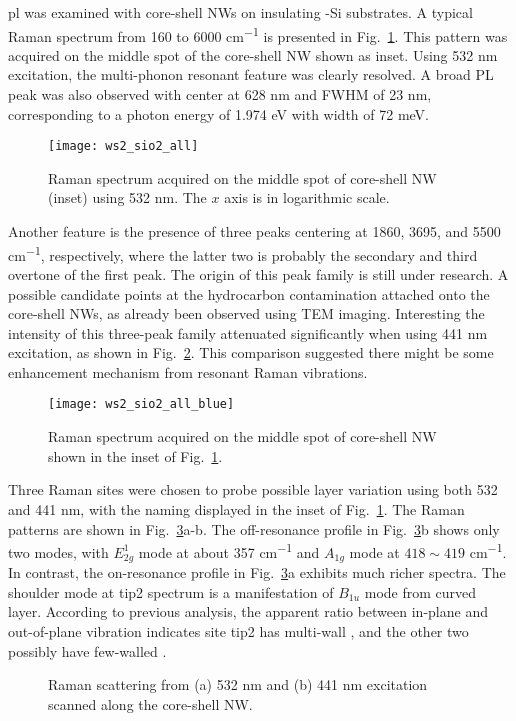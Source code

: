 \Gls{pl} was examined with core-shell NWs on insulating -Si substrates. A typical Raman spectrum from 160 to 6000 \si{cm^{-1}} is presented in Fig.~\ref{fig:ws2ramall}. This pattern was acquired on the middle spot of the core-shell NW shown as inset. Using 532 nm excitation, the multi-phonon resonant feature was clearly resolved. A broad PL peak was also observed with center at 628 nm and FWHM of 23 nm, corresponding to a photon energy of 1.974 eV with width of 72 meV.  
\begin{figure}[htb]
\centering
\texttt{[image: ws2\_sio2\_all]}
\caption{Raman spectrum acquired on the middle spot of core-shell NW (inset) using 532 nm. The $x$ axis is in logarithmic scale.}
\label{fig:ws2ramall}
\end{figure}
Another feature is the presence of three peaks centering at 1860, 3695, and 5500 \si{cm^{-1}}, respectively, where the latter two is probably the secondary and third overtone of the first peak. The origin of this peak family is still under research. A possible candidate points at the hydrocarbon contamination attached onto the core-shell NWs, as already been observed using TEM imaging. Interesting the intensity of this three-peak family attenuated significantly when using 441 nm excitation, as shown in Fig.~\ref{fig:ws2ramblue}. This comparison suggested there might be some enhancement mechanism from  resonant Raman vibrations. 
\begin{figure}[htb]
\centering
\texttt{[image: ws2\_sio2\_all\_blue]}
\caption{Raman spectrum acquired on the middle spot of core-shell NW shown in the inset of Fig.~\ref{fig:ws2ramall}.}
\label{fig:ws2ramblue}
\end{figure}
Three Raman sites were chosen to probe possible layer variation using both 532 and 441 nm, with the naming displayed in the inset of Fig.~\ref{fig:ws2ramall}. The Raman patterns are shown in Fig.~\ref{fig:ws2ram3site}a-b. The off-resonance profile in Fig.~\ref{fig:ws2ram3site}b shows only two modes, with $E_{2g}^1$ mode at about 357 \si{cm^{-1}} and $A_{1g}$ mode at $418\sim419$ \si{cm^{-1}}. In contrast, the on-resonance profile in Fig.~\ref{fig:ws2ram3site}a exhibits much richer spectra. The shoulder mode at tip2 spectrum is a manifestation of $B_{1u}$ mode from curved  layer. According to previous analysis, the apparent ratio between in-plane and out-of-plane vibration indicates site tip2 has multi-wall , and the other two possibly have few-walled . 
\begin{figure}[htb]
\centering
{}\hspace{0.04\textwidth}
\caption{Raman scattering from (a) 532 nm and (b) 441 nm excitation scanned along the core-shell NW.}
\label{fig:ws2ram3site}
\end{figure}
